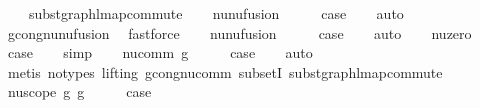\begin{isabellebody}
\ \ \ \ subst{\isacharunderscore}{\kern0pt}graph{\isacharunderscore}{\kern0pt}lmap{\isacharunderscore}{\kern0pt}commute{\isacharparenright}{\kern0pt}\isanewline
{}\isamarkupfalse%
\isanewline
\ \ \isamarkupfalse%
\ nu{\isacharunderscore}{\kern0pt}nu{\isacharunderscore}{\kern0pt}fusion{}\isanewline
\ \ \isamarkupfalse%
\ \isamarkupfalse%
\ {\isacharquery}{\kern0pt}case\isanewline
\ \ \isamarkupfalse%
\ auto\isanewline
\ \ \isamarkupfalse%
\ gcong{\isachardot}{\kern0pt}nu{\isacharunderscore}{\kern0pt}nu{\isacharunderscore}{\kern0pt}fusion{}\ \isamarkupfalse%
\ fastforce\isanewline
{}\isamarkupfalse%
\isanewline
\ \ \isamarkupfalse%
\ nu{\isacharunderscore}{\kern0pt}nu{\isacharunderscore}{\kern0pt}fusion{}\isanewline
\ \ \isamarkupfalse%
\ \isamarkupfalse%
\ {\isacharquery}{\kern0pt}case\isanewline
\ \ \isamarkupfalse%
\ auto\isanewline
{}\isamarkupfalse%
\isanewline
\ \ \isamarkupfalse%
\ nu{\isacharunderscore}{\kern0pt}zero\isanewline
\ \ \isamarkupfalse%
\ \isamarkupfalse%
\ {\isacharquery}{\kern0pt}case\isanewline
\ \ \isamarkupfalse%
\ simp\isanewline
{}\isamarkupfalse%
\isanewline
\ \ \isamarkupfalse%
\ {\isacharparenleft}{\kern0pt}nu{\isacharunderscore}{\kern0pt}comm\ g{\isacharparenright}{\kern0pt}\isanewline
\ \ \isamarkupfalse%
\ \isamarkupfalse%
\ {\isacharquery}{\kern0pt}case\isanewline
\ \ \isamarkupfalse%
\ auto\isanewline
\ \ \isamarkupfalse%
\ {\isacharparenleft}{\kern0pt}metis\ {\isacharparenleft}{\kern0pt}no{\isacharunderscore}{\kern0pt}types{\isacharcomma}{\kern0pt}\ lifting{\isacharparenright}{\kern0pt}\ gcong{\isachardot}{\kern0pt}nu{\isacharunderscore}{\kern0pt}comm\ subsetI\ subst{\isacharunderscore}{\kern0pt}graph{\isacharunderscore}{\kern0pt}lmap{\isacharunderscore}{\kern0pt}commute{\isacharparenright}{\kern0pt}\isanewline
{}\isamarkupfalse%
\isanewline
\ \ \isamarkupfalse%
\ {\isacharparenleft}{\kern0pt}nu{\isacharunderscore}{\kern0pt}scope\ g{}\ g{}{\isacharparenright}{\kern0pt}\isanewline
\ \ \isamarkupfalse%
\ \isamarkupfalse%
\ {\isacharquery}{\kern0pt}case\isanewline

\end{isabellebody}
